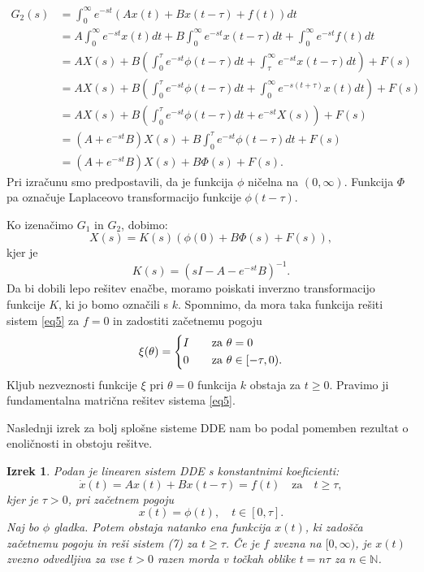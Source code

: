 \documentclass[12pt,a4paper]{amsart}
\theoremstyle{definition} %
\theoremstyle{plain} %
\newtheorem{izrek}[definicija]{Izrek}
\newcommand{\N}{\mathbb N}
\begin{document}
\begin{equation*}
    \begin{split}
        G_2(s)&= \int_0^{\infty}e^{-st}\left(Ax(t)+Bx(t-\tau)+f(t)\right)dt \\
            &= A\int_0^{\infty}e^{-st}x(t)dt+B\int_0^{\infty}e^{-st}x(t-\tau)dt+\int_0^{\infty}e^{-st}f(t)dt \\
            &= AX(s) + B\left(\int_0^{\tau}e^{-st}\phi(t-\tau)dt+\int_{\tau}^{\infty}e^{-st}x(t-\tau)dt\right) + F(s) \\
            &= AX(s) + B\left(\int_0^{\tau}e^{-st}\phi(t-\tau)dt+\int_{0}^{\infty}e^{-s(t+\tau)}x(t)dt\right) + F(s) \\
            &= AX(s) + B\left(\int_0^{\tau}e^{-st}\phi(t-\tau)dt+e^{-st}X(s)\right)+F(s) \\
            &= (A+e^{-st}B)X(s) + B\int_0^{\tau}e^{-st}\phi(t-\tau)dt+F(s) \\
            &= (A+e^{-st}B)X(s) + B\Phi(s)+F(s).
    \end{split}      
\end{equation*}
Pri izračunu smo predpostavili, da je funkcija $\phi$ ničelna na $(0,\infty)$. Funkcija $\Phi$ pa 
označuje Laplaceovo transformacijo funkcije $\phi(t-\tau)$.

Ko izenačimo $G_1$ in $G_2$, dobimo:
\[X(s)=K(s)(\phi(0)+B\Phi(s)+F(s)),\]
kjer je 
\[K(s)=(sI-A-e^{-st}B)^{-1}.\]
Da bi dobili lepo rešitev enačbe, moramo poiskati inverzno transformacijo funkcije $K$, ki jo bomo označili s $k$.
Spomnimo, da mora taka funkcija rešiti sistem \eqref{eq5} za $f=0$ in zadostiti začetnemu pogoju
\[
        \xi(\theta) =
        \begin{dcases}
            I &\quad \text{za  } \theta=0 \\
            0 &\quad \text{za  } \theta \in [-\tau,0). \\
        \end{dcases}
    \]
Kljub nezveznosti funkcije $\xi$ pri $\theta=0$ funkcija $k$ obstaja za $t\geq0$. Pravimo ji fundamentalna matrična
rešitev sistema \eqref{eq5}.

Naslednji izrek za bolj splošne sisteme DDE nam bo podal pomemben rezultat o enoličnosti in obstoju rešitve.

\begin{izrek}
    Podan je linearen sistem DDE s konstantnimi koeficienti:
    \begin{equation} \label{eq7}
        \dot{x}(t)=Ax(t)+Bx(t-\tau)=f(t)\quad \text{za}\quad t\geq\tau,
    \end{equation}
    kjer je $\tau>0$, pri začetnem pogoju
    \[x(t)=\phi(t), \quad t \in[0,\tau].\]
    Naj bo $\phi$ gladka. Potem obstaja natanko ena funkcija $x(t)$, ki 
    zadošča začetnemu pogoju in reši sistem (7) za $t\geq\tau$. Če je $f$ zvezna na $[0,\infty)$, je $x(t)$ 
    zvezno odvedljiva za vse $t>0$ razen morda v točkah oblike $t=n\tau$ za $n\in\N$.
\end{izrek}
\end{document}
